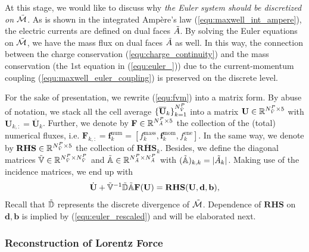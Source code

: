 \documentclass{article}
\begin{document}
At this stage, we would like to discuss why \emph{the Euler system should be discretized
  on $\Tilde{\mathcal{M}}$}. As is shown in the integrated Amp\`{e}re's law
(\ref{equ:maxwell_int_ampere}), the electric currents are defined on dual faces
$\Tilde{A}$. By solving the Euler equations on $\Tilde{\mathcal{M}}$, we have the mass
flux on dual faces $\Tilde{A}$ as well. In this way, the connection between the charge
conservation (\ref{equ:charge_continuity}) and the mass conservation (the 1st equation in
(\ref{equ:euler_})) due to the current-momentum coupling
(\ref{equ:maxwell_euler_coupling}) is preserved on the discrete level.

For the sake of presentation, we rewrite (\ref{equ:fvm}) into a matrix form. By abuse of
notation, we stack all the cell average
$\{\overline{\mathbf{U}}_k\}_{k=1}^{N^P_{\Tilde{V}}}$ into a matrix
$\mathbf{U} \in \mathbb{R}^{N_{\Tilde{V}}^P \times 5}$ with
$\mathbf{U}_{k,:} = \overline{\mathbf{U}}_k$. Further, we denote by
$\mathbf{F} \in \mathbb{R}^{N_{\Tilde{A}}^P \times 5}$ the collection of the (total)
numerical fluxes, i.e.
$\mathbf{F}_{k,:} = \mathbf{f}^\text{num}_k = [f^\text{mass}_k, \bm{f}^\text{mom}_k,
f^\text{ene}_k]$. In the same way, we denote by
$\mathbf{RHS}\in \mathbb{R}^{N_{\Tilde{V}}^P \times 5}$ the collection of
$\overline{\mathbf{RHS}}_k$. Besides, we define the diagonal matrices
$\mathbb{\Tilde{V}} \in \mathbb{R}^{N_{\Tilde{V}}^P \times N_{\Tilde{V}}^P}$ and
$\mathbb{\Tilde{A}}\in \mathbb{R}^{N_{\Tilde{A}}^P \times N_{\Tilde{A}}^P}$ with
$(\mathbb{\Tilde{A}})_{k,k} = |\Tilde{A}_k|$. Making use of the incidence matrices, we end
up with
\begin{equation} \label{equ:euler_matrix_form}
    \dot{\mathbf{U}} + \mathbb{\Tilde{V}}^{-1}\mathbb{\Tilde{D}}\mathbb{\Tilde{A}}\mathbf{F}(\mathbf{U})  = \mathbf{RHS}(\mathbf{U},\mathbf{d},\mathbf{b}),
\end{equation}
Recall that $\Tilde{\mathbb{D}}$ represents the discrete divergence of
$\Tilde{\mathcal{M}}$. Dependence of $\mathbf{RHS}$ on $\mathbf{d}, \mathbf{b}$ is implied
by (\ref{equ:euler_rescaled}) and will be elaborated next.

\subsubsection{Reconstruction of Lorentz Force} \label{sec:recon_lorentz_f}
\end{document}

